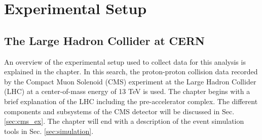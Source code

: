 \chapter{Experimental Setup}
\minitoc
\section{The Large Hadron Collider at CERN}
An overview of the experimental setup used to collect data for this analysis is explained in the chapter. 
In this search, the proton-proton collision data recorded by the Compact Muon Solenoid (CMS) experiment at the Large Hadron Collider (LHC) at a center-of-mass energy of 13 TeV is used.
The chapter begins with a brief explanation of the LHC including the pre-accelerator complex. The different components and subsystems of the CMS detector will be discussed in Sec. \ref{sec:cms_ex}. The chapter will end with a description of the event simulation tools in Sec. \ref{sec:simulation}. 
